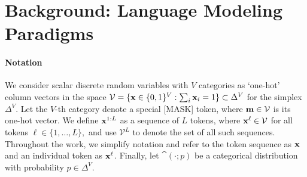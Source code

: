 \documentclass{article} %
\newcommand{\TODO}[1]{\textcolor{red}{[TODO: #1]}}
\def\algos{BD3-LMs}
\begin{document}


\section{Background: Language Modeling Paradigms}\label{sec:background}
\paragraph{Notation}
We consider scalar discrete random variables with $V$ categories as `one-hot' column vectors in the space $\mathcal{V} = \{{\mathbf x} \in \{0, 1\}^{V} : \sum_i {\mathbf x}_i = 1\}\subset \Delta^V$ for the simplex $\Delta^V$. Let the $V$-th category denote a special [MASK] token, where
${\mathbf m} \in \mathcal{V}$ is its one-hot vector.
We define ${\mathbf x}^{1:L}$ as a sequence of $L$ tokens, where ${\mathbf x}^\ell \in \mathcal{V}$ for all tokens $\ell \in \{1, \ldots, L\},$ and use $\mathcal{V}^L$ to denote the set of all such sequences. Throughout the work, we simplify notation and refer to the token sequence as ${\mathbf x}$ and an individual token as ${\mathbf x}^\ell$. Finally, let $\cat(\cdot; p)$ be a categorical distribution with probability $p \in \Delta^V$. 
\end{document}
